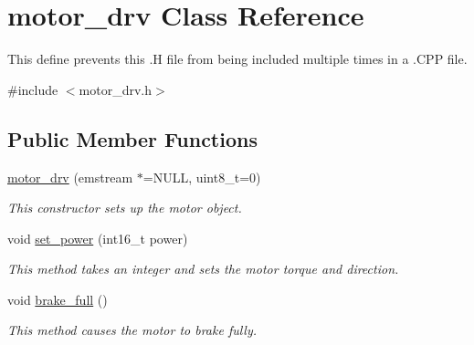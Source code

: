\hypertarget{classmotor__drv}{\section{motor\-\_\-drv Class Reference}
\label{classmotor__drv}
}


This define prevents this .H file from being included multiple times in a .C\-P\-P file.  




{\ttfamily \#include $<$motor\-\_\-drv.\-h$>$}

\subsection*{Public Member Functions}
\begin{DoxyCompactItemize}
\item 
\hyperlink{classmotor__drv_a13875fc8133ee2c8af383c4316278d84}{motor\-\_\-drv} (emstream $\ast$=N\-U\-L\-L, uint8\-\_\-t=0)
\begin{DoxyCompactList}\small\item\em This constructor sets up the motor object. \end{DoxyCompactList}\item 
void \hyperlink{classmotor__drv_a4b6d6fc9698bf76b9bf1bcbb660ad3b7}{set\-\_\-power} (int16\-\_\-t power)
\begin{DoxyCompactList}\small\item\em This method takes an integer and sets the motor torque and direction. \end{DoxyCompactList}\item 
void \hyperlink{classmotor__drv_ab9d99a1b71f8515240ff7748a16c937b}{brake\-\_\-full} ()
\begin{DoxyCompactList}\small\item\em This method causes the motor to brake fully. \end{DoxyCompactList}\end{DoxyCompactItemize}
